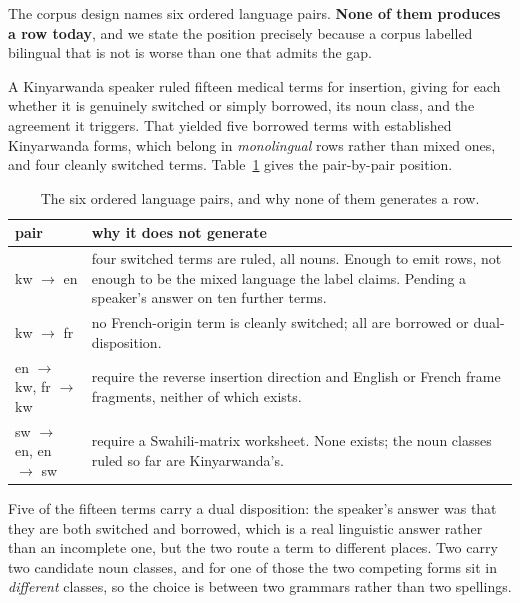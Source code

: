 The corpus design names six ordered language pairs. \textbf{None of them produces
a row today}, and we state the position precisely because a corpus labelled
bilingual that is not is worse than one that admits the gap.

A Kinyarwanda speaker ruled fifteen medical terms for insertion, giving for each
whether it is genuinely switched or simply borrowed, its noun class, and the
agreement it triggers. That yielded five borrowed terms with established
Kinyarwanda forms, which belong in \emph{monolingual} rows rather than mixed
ones, and four cleanly switched terms. Table~\ref{tab:codeswitch} gives the
pair-by-pair position.

\begin{table}[t]
\centering\small
\setlength{\tabcolsep}{4pt}
\begin{tabular}{>{\raggedright\arraybackslash}p{3cm}>{\raggedright\arraybackslash}p{11cm}}
\toprule
pair & why it does not generate \\
\midrule
kw $\rightarrow$ en & four switched terms are ruled, all nouns. Enough to emit
rows, not enough to be the mixed language the label claims. Pending a speaker's
answer on ten further terms. \\
kw $\rightarrow$ fr & no French-origin term is cleanly switched; all are
borrowed or dual-disposition. \\
en $\rightarrow$ kw, fr $\rightarrow$ kw & require the reverse insertion
direction and English or French frame fragments, neither of which exists. \\
sw $\rightarrow$ en, en $\rightarrow$ sw & require a Swahili-matrix worksheet.
None exists; the noun classes ruled so far are Kinyarwanda's. \\
\bottomrule
\end{tabular}
\caption{The six ordered language pairs, and why none of them generates a row.}
\label{tab:codeswitch}
\end{table}

Five of the fifteen terms carry a dual disposition: the speaker's answer was
that they are both switched and borrowed, which is a real linguistic answer
rather than an incomplete one, but the two route a term to different places.
Two carry two candidate noun classes, and for one of those the two competing
forms sit in \emph{different} classes, so the choice is between two grammars
rather than two spellings.

